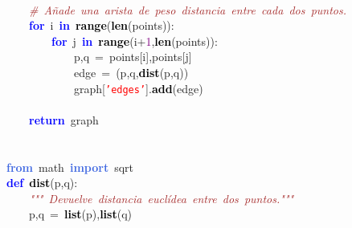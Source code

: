\mbox{}\ \ \ \  \\
\mbox{}\ \ \ \ \textit{\textcolor{Brown}{\#\ Añade\ una\ arista\ de\ peso\ distancia\ entre\ cada\ dos\ puntos.}} \\
\mbox{}\ \ \ \ \textbf{\textcolor{Blue}{for}}\ i\ \textbf{\textcolor{Blue}{in}}\ \textbf{\textcolor{Black}{range}}\textcolor{BrickRed}{(}\textbf{\textcolor{Black}{len}}\textcolor{BrickRed}{(}points\textcolor{BrickRed}{)):}\  \\
\mbox{}\ \ \ \ \ \ \ \ \textbf{\textcolor{Blue}{for}}\ j\ \textbf{\textcolor{Blue}{in}}\ \textbf{\textcolor{Black}{range}}\textcolor{BrickRed}{(}i\textcolor{BrickRed}{+}\textcolor{Purple}{1}\textcolor{BrickRed}{,}\textbf{\textcolor{Black}{len}}\textcolor{BrickRed}{(}points\textcolor{BrickRed}{)):} \\
\mbox{}\ \ \ \ \ \ \ \ \ \ \ \ p\textcolor{BrickRed}{,}q\ \textcolor{BrickRed}{=}\ points\textcolor{BrickRed}{[}i\textcolor{BrickRed}{],}points\textcolor{BrickRed}{[}j\textcolor{BrickRed}{]} \\
\mbox{}\ \ \ \ \ \ \ \ \ \ \ \ edge\ \textcolor{BrickRed}{=}\ \textcolor{BrickRed}{(}p\textcolor{BrickRed}{,}q\textcolor{BrickRed}{,}\textbf{\textcolor{Black}{dist}}\textcolor{BrickRed}{(}p\textcolor{BrickRed}{,}q\textcolor{BrickRed}{))} \\
\mbox{}\ \ \ \ \ \ \ \ \ \ \ \ graph\textcolor{BrickRed}{[}\texttt{\textcolor{Red}{'edges'}}\textcolor{BrickRed}{].}\textbf{\textcolor{Black}{add}}\textcolor{BrickRed}{(}edge\textcolor{BrickRed}{)} \\
\mbox{}\ \ \ \ \ \ \ \ \ \ \ \  \\
\mbox{}\ \ \ \ \textbf{\textcolor{Blue}{return}}\ graph \\
\mbox{} \\
\mbox{} \\
\mbox{}\textbf{\textcolor{RoyalBlue}{from}}\ math\ \textbf{\textcolor{RoyalBlue}{import}}\ sqrt \\
\mbox{}\textbf{\textcolor{Blue}{def}}\ \textbf{\textcolor{Black}{dist}}\textcolor{BrickRed}{(}p\textcolor{BrickRed}{,}q\textcolor{BrickRed}{):} \\
\mbox{}\textit{\textcolor{Brown}{\ \ \ \ "{}"{}"{}\ Devuelve\ distancia\ euclídea\ entre\ dos\ puntos."{}"{}"{}}} \\
\mbox{}\ \ \ \ p\textcolor{BrickRed}{,}q\ \textcolor{BrickRed}{=}\ \textbf{\textcolor{Black}{list}}\textcolor{BrickRed}{(}p\textcolor{BrickRed}{),}\textbf{\textcolor{Black}{list}}\textcolor{BrickRed}{(}q\textcolor{BrickRed}{)} \\
